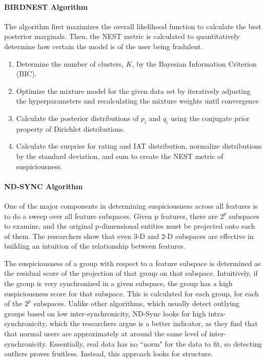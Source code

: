 \documentclass[11pt, oneside]{article}   	%
\begin{document}
\paragraph*{BIRDNEST Algorithm}
\quad

\quad The algorithm first maximizes the overall likelihood function to calculate the best posterior marginals.
Then, the NEST metric is calculated to quantitatively determine how certain the model is of the user being fradulent.
\begin{enumerate}
	\item Determine the number of clusters, $K$, by the Bayesian Information Criterion (BIC).
	\item Optimize the mixture model for the given data set by iteratively adjusting the hyperparameters and recalculating the mixture weights until convergence
	\item Calculate the posterior distributions of $p_i$ and $q_i$ using the conjugate prior property of Dirichlet distributions.
	\item Calculate the surprise for rating and IAT distribution, normalize distributions by the standard deviation, and sum to create the NEST metric of suspiciousness. 
\end{enumerate}

\paragraph*{ND-SYNC Algorithm}
\quad

\quad One of the major components in determining suspiciousness across all features is to do a sweep over all feature subspaces.
Given p features, there are $2^p$ subspaces to examine, and the original p-dimensional entities must be projected onto each of them.
The researchers show that even 3-D and 2-D subspaces are effective in building an intuition of the relationship between features.

\quad The suspiciousness of a group with respect to a feature subspace is determined as the residual score of the projection of that group on that subspace.
Intuitively, if the group is very synchronized in a given subspace, the group has a high suspiciousness score for that subspace.
This is calculated for each group, for each of the $2^p$ subspaces.
Unlike other algorithms, which usually detect outlying groups based on low inter-synchronicity, ND-Sync looks for high intra-synchronicity, which the researchers argue is a better indicator, as they find that that normal users are approximately at around the same level of inter-synchronicity.
Essentially, real data has no ``norm" for the data to fit, so detecting outliers proves fruitless.
Instead, this approach looks for structure.
\end{document}
